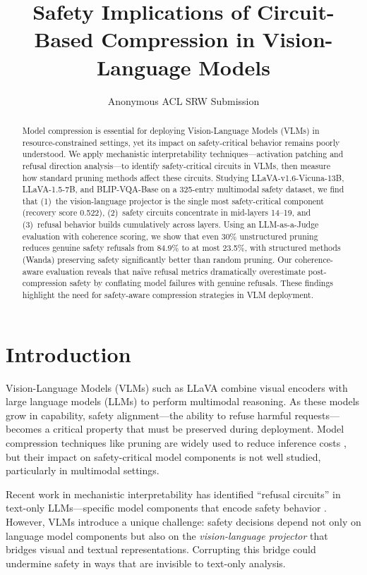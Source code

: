 \documentclass[11pt]{article}
\title{Safety Implications of Circuit-Based Compression in Vision-Language Models}
\author{Anonymous ACL SRW Submission}
\begin{document}
\maketitle

\begin{abstract}
Model compression is essential for deploying Vision-Language Models (VLMs) in resource-constrained settings, yet its impact on safety-critical behavior remains poorly understood. We apply mechanistic interpretability techniques---activation patching and refusal direction analysis---to identify safety-critical circuits in VLMs, then measure how standard pruning methods affect these circuits. Studying LLaVA-v1.6-Vicuna-13B, LLaVA-1.5-7B, and BLIP-VQA-Base on a 325-entry multimodal safety dataset, we find that (1)~the vision-language projector is the single most safety-critical component (recovery score 0.522), (2)~safety circuits concentrate in mid-layers 14--19, and (3)~refusal behavior builds cumulatively across layers. Using an LLM-as-a-Judge evaluation with coherence scoring, we show that even 30\% unstructured pruning reduces genuine safety refusals from 84.9\% to at most 23.5\%, with structured methods (Wanda) preserving safety significantly better than random pruning. Our coherence-aware evaluation reveals that na\"ive refusal metrics dramatically overestimate post-compression safety by conflating model failures with genuine refusals. These findings highlight the need for safety-aware compression strategies in VLM deployment.
\end{abstract}

\section{Introduction}

Vision-Language Models (VLMs) such as LLaVA \citep{liu2024visual} combine visual encoders with large language models (LLMs) to perform multimodal reasoning. As these models grow in capability, safety alignment---the ability to refuse harmful requests---becomes a critical property that must be preserved during deployment. Model compression techniques like pruning are widely used to reduce inference costs \citep{frantar2023sparsegpt,sun2024simple}, but their impact on safety-critical model components is not well studied, particularly in multimodal settings.

Recent work in mechanistic interpretability has identified ``refusal circuits'' in text-only LLMs---specific model components that encode safety behavior \citep{arditi2024refusal,li2024inference}. However, VLMs introduce a unique challenge: safety decisions depend not only on language model components but also on the \emph{vision-language projector} that bridges visual and textual representations. Corrupting this bridge could undermine safety in ways that are invisible to text-only analysis.
\end{document}
